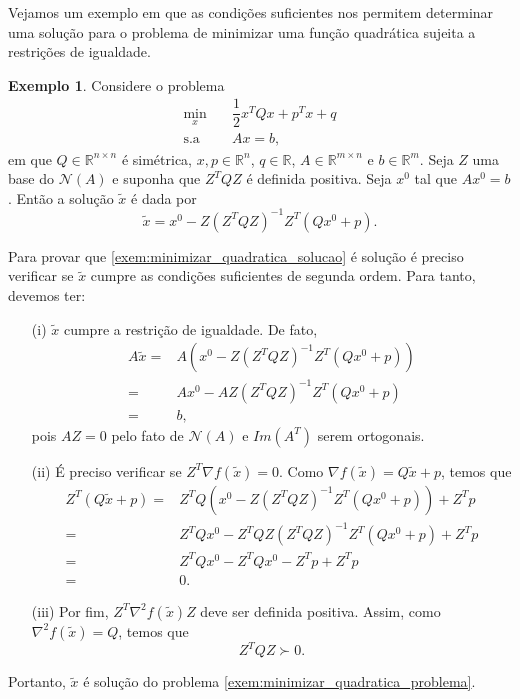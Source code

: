 \documentclass[12pt,a4paper]{scrartcl}
\def\RR{\mathds{R}}
\theoremstyle{definition}%
\newtheorem{exem}{Exemplo}
\begin{document}
Vejamos um exemplo em que as condições suficientes nos permitem determinar uma solução para o problema de minimizar uma função quadrática sujeita a restrições de igualdade.

\begin{exem}
Considere o problema
\[ \begin{aligned} \label{exem:minimizar_quadratica_problema}
\min_{x} & \quad \dfrac{1}{2}x^{T}Qx + p^{T}x + q \\
\text{s.a} & \quad Ax = b,
\end{aligned} \]
em que $Q \in \RR^{n\times n}$ é simétrica, $ x,p \in \RR^{n}$, $q \in \RR$, $A \in \RR^{m\times n}$ e $b \in \RR^{m}$. Seja $Z$ uma base do $\mathcal{N}(A)$ e suponha que $Z^{T}QZ$ é definida positiva. Seja $x^{0}$ tal que $Ax^{0}=b$. Então a solução $\tilde{x}$ é dada por
\[ \label{exem:minimizar_quadratica_solucao}
\tilde{x} = x^{0} - Z(Z^{T}QZ)^{-1} Z^{T}(Qx^{0} + p).
\]
\end{exem}
Para provar que \eqref{exem:minimizar_quadratica_solucao} é solução é preciso verificar se $\tilde{x}$ cumpre as condições suficientes de segunda ordem. Para tanto, devemos ter:
\begin{enumerate}
	\item[(i)] $\tilde{x}$ cumpre a restrição de igualdade. De fato,
	\[ \begin{aligned}
	A\tilde{x} = & A(x^{0} - Z(Z^{T}QZ)^{-1} Z^{T}(Qx^{0} + p)) \\
	= & Ax^{0} - AZ(Z^{T}QZ)^{-1} Z^{T}(Qx^{0} + p) \\
	= & b,
	\end{aligned} \]
pois $AZ=0$ pelo fato de $\mathcal{N}(A)$ e $Im(A^{T})$ serem ortogonais.

	\item[(ii)] É preciso verificar se $Z^{T}\nabla f(\tilde{x}) = 0$. Como $\nabla f(\tilde{x}) = Q\tilde{x} + p$, temos que
	\[ \begin{aligned}
	Z^{T}(Q\tilde{x} +p) =& Z^{T} Q (x^{0} - Z(Z^{T}QZ)^{-1}Z^{T}(Qx^{0} +p)) + Z^{T}p \\
	=& Z^{T} Qx^{0} - Z^{T}QZ(Z^{T}QZ)^{-1}Z^{T}(Qx^{0} +p) + Z^{T}p \\
	=& Z^{T} Qx^{0} - Z^{T} Qx^{0} - Z^{T} p + Z^{T} p \\
	=& 0.
	\end{aligned} \]

	\item[(iii)] Por fim, $Z^{T}\nabla^{2} f(\tilde{x})Z$ deve ser definida positiva. Assim, como $\nabla^{2} f(\tilde{x}) = Q$, temos que 
	\[
	Z^{T}QZ \succ 0.
	\]
\end{enumerate}
Portanto, $\tilde{x}$ é solução do problema \eqref{exem:minimizar_quadratica_problema}.
\end{document}
